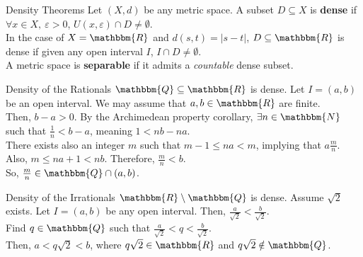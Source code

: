 \documentclass[10pt]{extarticle}
\newcommand{\N}{\mathbbm{N}}
\newcommand{\Q}{\mathbbm{Q}}
\newcommand{\R}{\mathbbm{R}}
\begin{document}
  \begin{problem}{Density Theorems}
    Let $(X,d)$ be any metric space. A subset $D\subseteq X$ is \textbf{dense} if $\forall x\in X,~ \varepsilon > 0$, $U(x,\varepsilon) \cap D \neq \emptyset$.\\

    In the case of $X = \R$ and $d(s,t) = |s-t|$, $D\subseteq \R$ is dense if given any open interval $I$, $I\cap D \neq \emptyset$.\\

    A metric space is \textbf{separable} if it admits a \textsl{countable} dense subset.
    \begin{problem}{Density of the Rationals}
      $\Q\subseteq\R$ is dense.
      \tcblower
      Let $I = (a,b)$ be an open interval. We may assume that $a,b\in\R$ are finite.\\

      Then, $b-a > 0$. By the Archimedean property corollary, $\exists n\in\N$ such that $\frac{1}{n} < b-a$, meaning $1 < nb-na$.\\

      There exists also an integer $m$ such that $m-1 \leq na < m$, implying that $a \frac{m}{n}$. Also, $m \leq na+1 < nb$. Therefore, $\frac{m}{n} < b$.\\

      So, $\frac{m}{n}\in \Q\cap (a,b)$.
    \end{problem}
    \begin{problem}{Density of the Irrationals}
      $\R\setminus\Q$ is dense.
      \tcblower
      Assume $\sqrt{2}$ exists. Let $I = (a,b)$ be any open interval. Then, $\frac{a}{\sqrt{2}} < \frac{b}{\sqrt{2}}$.\\

      Find $q\in\Q$ such that $\frac{a}{\sqrt{2}} < q < \frac{b}{\sqrt{2}}$.\\

      Then, $a < q\sqrt{2} < b$, where $q\sqrt{2} \in\R$ and $q\sqrt{2}\notin\Q$.
    \end{problem}
  \end{problem}
\end{document}
